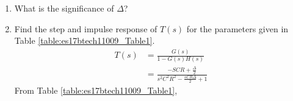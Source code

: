 \begin{enumerate}[label=\arabic*.,ref=\theenumi]
\item What is the significance of $\Delta$? 
\item Find the step and impulse  response of $T(s)$ for  the parameters given in Table \ref{table:es17btech11009_Table1}.
\\
\solution 
\begin{align}
    T(s) &= \frac{G(s)}{1-G(s)H(s)}
\\
&=\frac{-SCR + \frac{\Delta}{2}}{s^2C^2R^2 - \frac{sCR\Delta}{2} + 1}
\end{align}
From Table \ref{table:es17btech11009_Table1},
\begin{align}

\end{align}
\end{enumerate}
